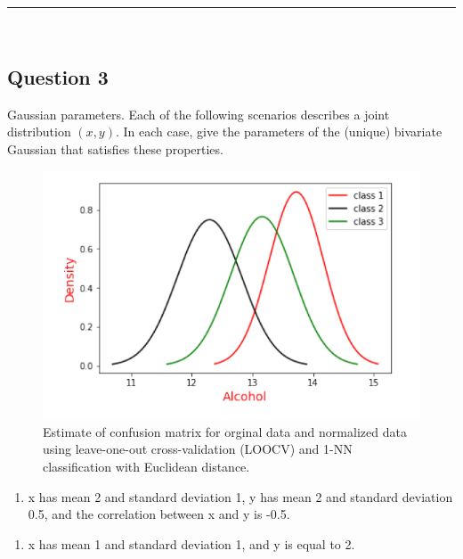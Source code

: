 \documentclass{article}
\begin{document}
\noindent\rule{\textwidth}{0.4pt}\\

\newpage

\subsection*{Question 3}
\parbox{\textwidth}{Gaussian parameters. Each of the following scenarios describes a joint distribution $(x, y)$. In each case, give the parameters of the (unique) bivariate Gaussian that satisfies these properties.}

\begin{figure}[H]

\includegraphics[width=1\textwidth]{dsc_255_hw3_q3.png} 
\caption{Estimate of confusion matrix for orginal data and normalized data using leave-one-out cross-validation (LOOCV) and 1-NN classification with Euclidean distance.}
    
\end{figure}

\begin{enumerate}[label=(a)]
    \item x has mean 2 and standard deviation 1, y has mean 2 and standard deviation 0.5, and the
correlation between x and y is -0.5.
\end{enumerate}
\begin{enumerate}[label=(b)]
    \item x has mean 1 and standard deviation 1, and y is equal to 2.
\end{enumerate}
\end{document}
